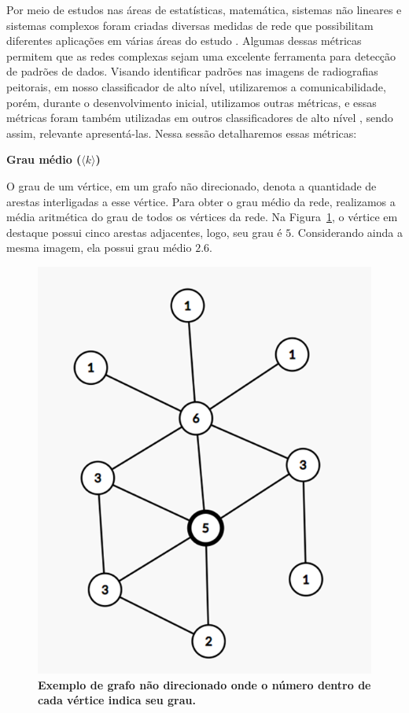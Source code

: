\documentclass[
12pt,        %
oneside,     %
a4paper,     %
english,       %
brazil        %
%
%
]{ppgca}
\begin{document}
Por meio de estudos nas áreas de estatísticas, matemática, sistemas não lineares e sistemas complexos foram criadas diversas medidas de rede que possibilitam diferentes aplicações em várias áreas do estudo \cite{Newman_2003, Silva2016}. Algumas dessas métricas permitem que as redes complexas sejam uma excelente ferramenta para detecção de padrões de dados. Visando identificar padrões nas imagens de radiografias peitorais, em nosso classificador de alto nível, utilizaremos a comunicabilidade, porém, durante o desenvolvimento inicial, utilizamos outras métricas, e essas métricas foram também utilizadas em outros classificadores de alto nível \cite{Colliri2018}, sendo assim, relevante apresentá-las. Nessa sessão detalharemos essas métricas:

\textbf{Grau médio ($\langle k \rangle$)}

O grau de um vértice, em um grafo não direcionado, denota a quantidade de arestas interligadas a esse vértice. Para obter o grau médio da rede, realizamos a média aritmética do grau de todos os vértices da rede. Na Figura~\ref{fig:graumedio}, o vértice em destaque possui cinco arestas adjacentes, logo, seu grau é $5$. Considerando ainda a mesma imagem, ela possui grau médio $2.6$.

\begin{figure}[H]
    \includegraphics[scale=0.8]{graumedio.png}
    \centering
    \caption{\textbf{Exemplo de grafo não direcionado onde o número dentro de cada vértice indica seu grau.}}
    \label{fig:graumedio}
\end{figure}
\end{document}

